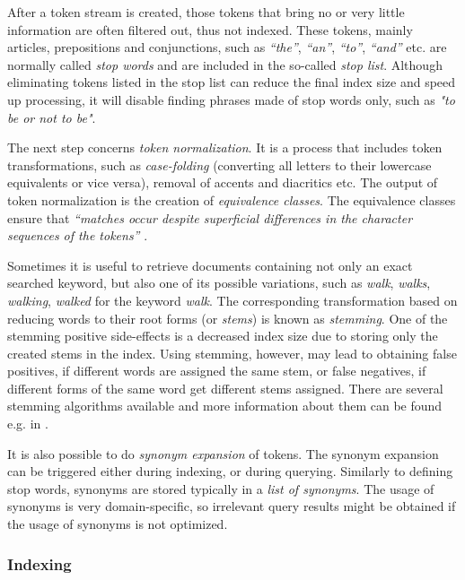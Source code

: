 After a token stream is created, those tokens that bring no or very little information are often filtered out, thus not indexed.
These tokens, mainly articles, prepositions and conjunctions, such as \textit{``the''}, \textit{``an''}, \textit{``to''}, \textit{``and''} etc. are normally called \textit{stop words} and are included in the so-called \textit{stop list}.
Although eliminating tokens listed in the stop list can reduce the final index size and speed up processing, it will disable finding phrases made of stop words only, such as \textit{"to be or not to be"}.

The next step concerns \textit{token normalization}. 
It is a process that includes token transformations, such as \textit{case-folding} (converting all letters to their lowercase equivalents or vice versa), removal of accents and diacritics etc.
The output of token normalization is the creation of \textit{equivalence classes}. 
The equivalence classes ensure that \textit{``matches occur despite superficial differences in the character sequences of the tokens''} \cite{ManningRaghavanSchuetze08}.

Sometimes it is useful to retrieve documents containing not only an exact searched keyword, but also one of its possible variations, such as \textit{walk}, \textit{walks}, \textit{walking}, \textit{walked} for the keyword \textit{walk}.
The corresponding transformation based on reducing words to their root forms (or \textit{stems}) is known as \textit{stemming}.
One of the stemming positive side-effects is a decreased index size due to storing only the created stems in the index.
Using stemming, however, may lead to obtaining false positives, if different words are assigned the same stem, or false negatives, if different forms of the same word get different stems assigned.
There are several stemming algorithms available and more information about them can be found e.g. in \cite{IRDataAlgorithms}.

It is also possible to do \textit{synonym expansion} of tokens. The synonym expansion can be triggered either during indexing, or during querying. Similarly to defining stop words, synonyms are stored typically in a \textit{list of synonyms}.
The usage of synonyms is very domain-specific, so irrelevant query results might be obtained if the usage of synonyms is not optimized.

\subsubsection{Indexing}

